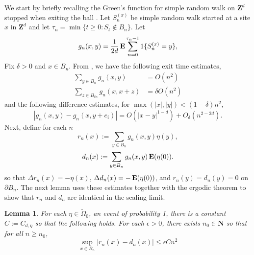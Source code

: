 \documentclass[12pt]{amsart}
\newcommand{\Z}{\mathbf{Z}}
\newcommand{\N}{\mathbf{N}}
\newcommand{\E}{\mathop{\bf E{}}}
\newtheorem{lemma}[theorem]{Lemma}
\begin{document}
We start by briefly recalling the Green's function for simple random walk on $\Z^d$ stopped when exiting the ball .
Let $S_n^{(x)}$ be simple random walk started at a site $x$ in $\Z^d$ and let $\tau_n = \min\{t \geq 0: S_{t} \not \in B_n \}$.
Let 	
\[
g_n(x,y) = \frac{1}{2d } \E \sum_{n=0}^{\tau_{n}-1} 1\{S_n^{(x)} = y\}, 
\]
Fix $\delta > 0$ and $x \in B_n$. From \cite{lawler2010random}, we have the following exit time estimates, 
\begin{equation} \label{exit_time}
\begin{aligned}
\sum_{y \in B_n} g_n(x,y)  &= O(n^2) \\ 
\sum_{z \in B_{\delta n}} g_n(x,x+z) &= \delta O(n^2)
\end{aligned}
\end{equation}
and the following difference estimates, for $\max(|x|,|y|) < (1-\delta) n^2$,
\begin{equation} \label{difference}
|g_n(x,y) - g_n(x,y + e_i)| = O(|x-y|^{1-d}) + O_{\delta}(n^{2-2d}).
\end{equation}
Next, define for each $n$ 
\[
r_n(x) := \sum_{y \in B_{n}} g_{n}(x,y) \eta(y),
\]
\[
d_n(x) :=  \sum_{y \in B_{n}} g_{n}(x,y) \E(\eta(0)).
\]
so that $\Delta r_n(x) = - \eta(x)$, $\Delta d_n(x) = -\E(\eta(0))$, and $r_n(y) = d_n(y) = 0$ on $\partial B_n$. 
The next lemma uses these estimates together with the ergodic theorem to show that $r_n$ and $d_n$ are identical in the scaling limit. 

\begin{lemma}\label{divisible_homogenize}
For each $\eta \in \tilde{\Omega}_0$, an event of probability 1, there is a constant $C := C_{d, \eta}$ so that the following holds. 
For each $\epsilon > 0$, there exists $n_0 \in \N$ so that for all  $n \geq n_0$, 
\begin{equation}\label{eq:divisible_homogenize}
\sup_{x \in B_n} \left| r_n(x) -d_n(x) \right| \leq \epsilon C n^2
\end{equation}
\end{lemma}

\end{document}
